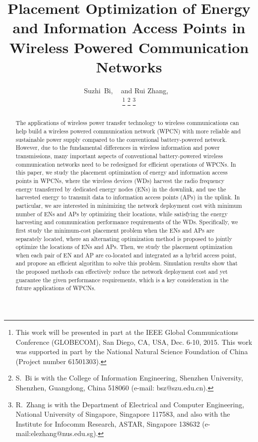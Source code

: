 \documentclass[journal, draftcls, one column, 12pt]{IEEEtran}
\begin{document}
\title{Placement Optimization of Energy and Information Access Points in Wireless Powered Communication Networks}
\author{Suzhi~Bi, ~ and Rui Zhang, ~ \\
                \thanks{This work will be presented in part at the IEEE Global Communications Conference (GLOBECOM), San Diego, CA, USA, Dec. 6-10, 2015. This work was supported in part by the National Natural Science Foundation of China (Project number 61501303).}
        \thanks{S.~Bi is with the College of Information Engineering, Shenzhen University, Shenzhen, Guangdong, China 518060 (e-mail: bsz@szu.edu.cn).}
        \thanks{R.~Zhang is with the Department of Electrical and Computer Engineering, National University of Singapore, Singapore 117583, and also with the Institute for Infocomm Research, ASTAR, Singapore 138632 (e-mail:elezhang@nus.edu.sg).} }

\maketitle

\vspace{-25pt}

\begin{abstract}
The applications of wireless power transfer technology to wireless communications can help build a wireless powered communication network (WPCN) with more reliable and sustainable power supply compared to the conventional battery-powered network. However, due to the fundamental differences in wireless information and power transmissions, many important aspects of conventional battery-powered wireless communication networks need to be redesigned for efficient operations of WPCNs. In this paper, we study the placement optimization of energy and information access points in WPCNs, where the wireless devices (WDs) harvest the radio frequency energy transferred by dedicated energy nodes (ENs) in the downlink, and use the harvested energy to transmit data to information access points (APs) in the uplink. In particular, we are interested in minimizing the network deployment cost with minimum number of ENs and APs by optimizing their locations, while satisfying the energy harvesting and communication performance requirements of the WDs. Specifically, we first study the minimum-cost placement problem when the ENs and APs are separately located, where an alternating optimization method is proposed to jointly optimize the locations of ENs and APs. Then, we study the placement optimization when each pair of EN and AP are co-located and integrated as a hybrid access point, and propose an efficient algorithm to solve this problem. Simulation results show that the proposed methods can effectively reduce the network deployment cost and yet guarantee the given performance requirements, which is a key consideration in the future applications of WPCNs.
\end{abstract}
\end{document}
